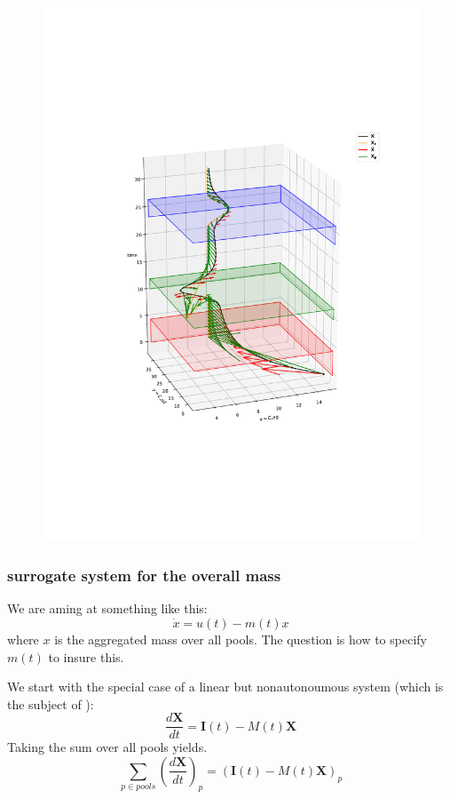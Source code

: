 \documentclass[journal abbreviation, manuscript]{copernicus}
\theoremstyle{definition}
\newcommand{\X}{\mathbf{X}}
\newcommand{\I}{\mathbf{I}}
\newcommand{\figref}[1]{Fig. \ref{#1}}
\begin{document}
\begin{figure}[t]
\includegraphics[height=.9\textheight]{figures/plot_vector_3d_X_Xc_time_z.pdf}
\caption{
  \label{Xc3D}
}
\end{figure}
\subsubsection{surrogate system for the overall mass}
We are aming at something like this:
$$
\dot{x}=u(t)-m(t)x
$$ 
where $x$ is the aggregated mass over all pools.
The question is how to specify $m(t)$ to insure this.

We start with the special case of a linear but nonautonoumous system (which is the subject of \citep{Luo2017Biogeosciences}):
$$
\frac{d \X}{d t}= \I(t) - M(t) \X 
$$
Taking the sum over all pools yields.
$$
\sum_{p \in pools} \left( \frac{d \X}{d t} \right)_p
=
\left( \I(t) - M(t) \X \right)_p
$$
\end{document}
